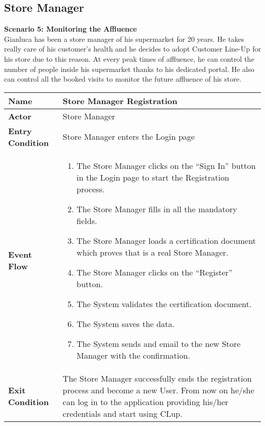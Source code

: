 \subsection{Store Manager}

\textbf{Scenario 5: Monitoring the Affluence}\\
Gianluca has been a store manager of his supermarket for 20 years. He takes really care of his customer’s health and he decides to adopt Customer Line-Up for his store due to this reason. At every peak times of affluence, he can control the number of people inside his supermarket thanks to his dedicated portal. He also can control all the booked visits to monitor the future affluence of his store.\\

\begin{center}
    \begin{tabular}{ | l | p{11cm} |}
    \hline
    \textbf{Name} & Store Manager Registration \\ \hline
    \textbf{Actor} & Store Manager \\ \hline
    \textbf{Entry Condition} & Store Manager enters the Login page  \\ \hline
    \textbf{Event Flow} & \begin{enumerate}
					\item The Store Manager clicks on the “Sign In” button in the Login page to start the Registration process.
					\item The Store Manager fills in all the mandatory fields.
					\item The Store Manager loads a certification document which proves that is a real Store Manager.
					\item The Store Manager clicks on the “Register” button.
					\item The System validates the certification document.
					\item The System saves the data.
					\item The System sends and email to the new Store Manager with the confirmation.
		            \end{enumerate}\\  \hline
    \textbf{Exit Condition} & The Store Manager successfully ends the registration process and become a new User. From now on he/she can log in to the application providing his/her credentials and start using CLup. \\ \hline
    \end{tabular}
\end{center}
